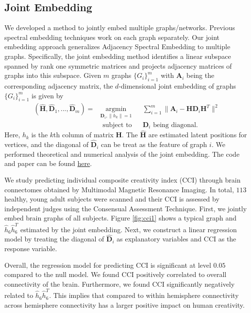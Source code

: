 \documentclass[simplex.tex]{subfiles}
\newcommand{\bA}{\mathbf{A}}
\newcommand{\bH}{\mathbf{H}}
\newcommand{\bD}{\mathbf{D}}
\begin{document}
\subsection{Joint Embedding}
We developed a method to jointly embed multiple graphs/networks. Previous spectral embedding techniques work on each graph separately. Our joint embedding approach generalizes Adjacency Spectral Embedding to multiple graphs. Specifically,  the joint embedding method identifies a linear subspace spanned by rank one symmetric matrices and projects adjacency matrices of graphs into this subspace. Given $m$ graphs $\{G_i \} _{i=1}^{m}$ with $\bA_i$ being the corresponding adjacency matrix, the $d$-dimensional joint embedding of graphs $\{G_i \} _{i=1}^{m}$ is given by
 \begin{equation*}
 	\begin{aligned}  
 	(\hat{\bH},\hat{\bD}_1,...,\hat{\bD}_m) =	& \underset{\bD_i,\|h_k\|=1}{\operatorname{argmin}} 
 		& & \sum\limits_{i=1}^{m} \| \bA_i- \bH \bD_i \bH^T \|  ^2 \\
 		& \text{ subject to} 
 		& &  \bD_i \text{ being diagonal.}
 	\end{aligned}
 \end{equation*}
Here, $h_k$ is the $k$th column of matrix $\bH$. The $\hat{\bH}$ are estimated latent positions for vertices, and the diagonal of $\hat{\bD}_i$ can be treat as the feature of graph $i$. We performed theoretical and numerical analysis of the joint embedding. The code and paper can be found \href{https://github.com/shangsiwang/Joint-Embedding}{here}.  

We study predicting individual composite creativity index (CCI) through brain connectomes obtained by Multimodal Magnetic Resonance Imaging. In total, $113$ healthy, young adult subjects were scanned and their CCI is assessed by independent judges using the Consensual Assessment Technique. First, we jointly embed brain graphs of all subjects. Figure \ref{fig:cci1} shows a typical graph and $\hat{h}_6 \hat{h}_6^T$ estimated by the joint embedding. Next, we construct a linear regression model by treating the diagonal of $\hat{\bD}_i$ as explanatory variables and CCI as the response variable. 

Overall, the regression model for predicting CCI is significant at level $0.05$ compared to the null model. We found CCI positively correlated to overall connectivity of the brain. Furthermore, we found CCI significantly negatively related to $\hat{h}_6 \hat{h}_6^T$. This implies that compared to within hemisphere connectivity across hemisphere connectivity has a larger positive impact on human creativity. 
\end{document}
